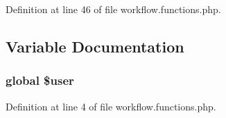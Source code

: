 Definition at line 46 of file workflow.functions.php.



\subsection{Variable Documentation}
\hypertarget{workflow_8functions_8php_a00365e6c5f70c43fb2ed86c9bc5626e0}{
\subsubsection[{\$user}]{\setlength{\rightskip}{0pt plus 5cm}global \$user}}
\label{workflow_8functions_8php_a00365e6c5f70c43fb2ed86c9bc5626e0}


Definition at line 4 of file workflow.functions.php.

